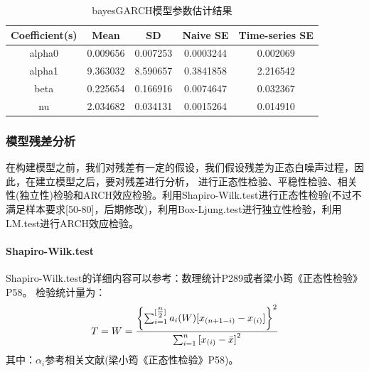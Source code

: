         \begin{table}[H]
        \centering
        \caption{bayesGARCH模型参数估计结果}
        \label{bayesGARCH模型参数估计结果}
        \begin{tabular}{ccccc}
            \toprule
           Coefficient(s) & Mean  &  SD & Naive SE  &  Time-series SE\\
        \midrule
        alpha0 & 0.009656 &   0.007253  &  0.0003244  & 0.002069\\
        alpha1 & 9.363032 &   8.590657  &  0.3841858  & 2.216542\\
        beta  &  0.225654&    0.166916 &   0.0074647 &  0.032367\\
        nu & 2.034682 &   0.034131  &  0.0015264  & 0.014910\\
        \bottomrule
        \end{tabular}
        \end{table}

        \subsubsection{模型残差分析}
            \par
            在构建模型之前，我们对残差有一定的假设，我们假设残差为正态白噪声过程，因此，在建立模型之后，要对残差进行分析， 进行正态性检验、平稳性检验、相关性(独立性)检验和ARCH效应检验。利用Shapiro-Wilk.test进行正态性检验(不过不满足样本要求[50-80]，后期修改)，利用Box-Ljung.test进行独立性检验，利用LM.test进行ARCH效应检验。
            \paragraph{Shapiro-Wilk.test}
            Shapiro-Wilk.test的详细内容可以参考：数理统计P289或者梁小筠《正态性检验》P58。
            检验统计量为：
            \[T = W = \frac{{{{\left\{ {\sum\nolimits_{i = 1}^{[{\textstyle{n \over 2}}]} {{a_i}(W)[{x_{\left( {n + 1 - i} \right)}} - {x_{(i)}}]} } \right\}}^2}}}{{\sum\nolimits_{i = 1}^n {{{[{x_{(i)}} - \bar x]}^2}} }}\]
            其中：$\alpha_i$参考相关文献(梁小筠《正态性检验》P58)。
